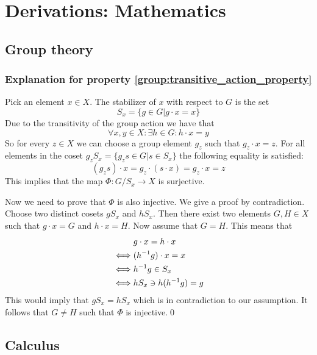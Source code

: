 \chapter{Derivations: Mathematics}

\section{Group theory}
\subsection{Explanation for property \ref{group:transitive_action_property}}\label{proof:stabilizer}

	Pick an element $x\in X$. The stabilizer of $x$ with respect to $G$ is the set \[S_x = \{g\in G| g\cdot x = x\}\]
	Due to the transitivity of the group action we have that \[\forall x, y\in X: \exists h\in G: h\cdot x = y\] So for every $z\in X$ we can choose a group element $g_z$ such that $g_z\cdot x = z$. For all elements in the coset $g_zS_x = \{g_zs\in G|s\in S_x\}$ the following equality is satisfied:
	\[(g_zs)\cdot x = g_z\cdot (s\cdot x) = g_z\cdot x = z\]
	This implies that the map $\Phi:G/S_x \rightarrow X$ is surjective.
	
	Now we need to prove that $\Phi$ is also injective. We give a proof by contradiction. Choose two distinct cosets $gS_x$ and $hS_x$. Then there exist two elements $G, H\in X$ such that $g\cdot x = G$ and $h\cdot x = H$. Now assume that $G = H$. This means that
	\begin{align*}
		&g\cdot x = h\cdot x\\
		\iff&(h^{-1}g)\cdot x = x\\
		\iff&h^{-1}g\in S_x\\
		\iff&hS_x\mathrel{\reflectbox{$\in$}}h(h^{-1}g) = g
	\end{align*}
	This would imply that $gS_x = hS_x$ which is in contradiction to our assumption. It follows that $G\neq H$ such that $\Phi$ is injective.\qed


\section{Calculus}
